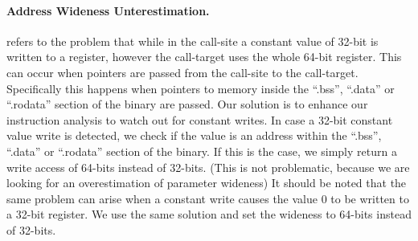 \paragraph{Address Wideness Unterestimation.} refers to the problem that while in the call-site a constant value of 32-bit is written to a register, however 
the call-target uses the whole 64-bit register. This can occur when pointers are passed from the call-site to the call-target. Specifically this happens 
when pointers to memory inside the ``.bss'', ``.data'' or ``.rodata'' section of the binary are passed.
Our solution is to enhance our instruction analysis to watch out for constant writes. In case a 32-bit constant value write is detected, we check if the
value is an address within the ``.bss'', ``.data'' or ``.rodata'' section of the binary. If this is the case, we simply return a write access of 64-bits 
instead of 32-bits. (This is not problematic, because we are looking for an overestimation of parameter wideness)
It should be noted that the same problem can arise when a constant write causes the value 0 to be written to a 32-bit register. We use the same solution
and set the wideness to 64-bits instead of 32-bits.
%
%
%
